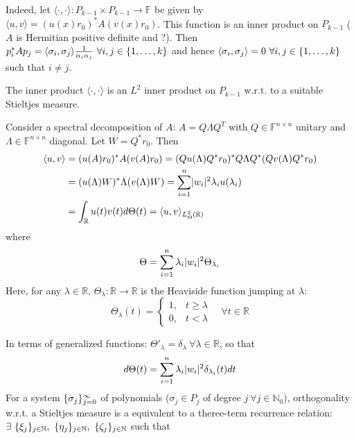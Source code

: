\documentclass[12pt]{article}
\theoremstyle{definition}
\theoremstyle{remark}
\numberwithin{equation}{section}
\newcommand{\F}{\mathbb{F}}
\newcommand{\R}{\mathbb{R}}
\newcommand{\N}{\mathbb{N}}
\DeclarePairedDelimiter{\set}{\{}{\}}
\DeclarePairedDelimiter{\abs}{\lvert}{\rvert}
\DeclarePairedDelimiter{\iprod}{\langle}{\rangle}
\begin{document}
Indeed, let $\langle\cdot,\cdot\rangle: P_{k-1} \times P_{k-1} \rightarrow \F$ be given by $\langle u,v\rangle = (u(x)r_0)^* A (v(x)r_0)$.  This function is an inner product on $P_{k-1}$ ($A$ is Hermitian positive definite and ?). Then $p_i^* A p_j = \langle \sigma_i, \sigma_j \rangle \frac{1}{\alpha_i \alpha_j}\ \forall i,j \in \set{1,\ldots,k}$ and hence $\langle \sigma_i, \sigma_j \rangle = 0\ \forall i,j \in \set{1,\ldots,k}$ such that $i \neq j$.

The inner product $\langle \cdot, \cdot \rangle$ is an $L^2$ inner product on $P_{k-1}$ w.r.t. to a suitable Stieltjes measure.

Consider a spectral decomposition of $A$: $A = Q \Lambda Q^T$ with $Q \in \F^{n\times n}$ unitary and $\Lambda \in \F^{n\times n}$ diagonal. Let $W = Q^* r_0$. Then
\begin{align*}
  \langle u, v \rangle &= (u(A) r_0)^* A (v(A) r_0) = (Qu(\Lambda)Q^* r_0)^* Q \Lambda Q^* (Qv(\Lambda)Q^*r_0) \\
  &= (u(\Lambda)W)^* \Lambda (v(\Lambda)W) = \sum_{i=1}^n \abs{w_i}^2 \lambda_i u(\lambda_i) \\
  &= \int_\R u(t)v(t) d\Theta(t) = \iprod{u,v}_{L^2_\Theta(\R)}
\end{align*}
where
\begin{equation*}
  \Theta = \sum_{i=1}^n \lambda_i \abs{w_i}^2 \Theta_{\lambda_i}
\end{equation*}
Here, for any $\lambda \in \R$, $\Theta_\lambda: \R \rightarrow \R$ is the Heaviside function jumping at $\lambda$:
\begin{equation*}
  \Theta_\lambda(t) =
  \begin{cases}
    1, & t \geq \lambda \\
    0, & t < \lambda
  \end{cases}
  \quad \forall t \in \R
\end{equation*}

In terms of generalized functions: $\Theta'_\lambda = \delta_\lambda\ \forall \lambda \in \R$, so that
\begin{equation*}
  d\Theta(t) = \sum_{i=1}^n \lambda_i \abs{w_i}^2 \delta_{\lambda_i}(t) dt
\end{equation*}
For a system $\set{\sigma_j}_{j=0}^{\infty}$ of polynomials ($\sigma_j \in P_j$ of degree $j\ \forall j \in \N_0$), orthogonality w.r.t. a Stieltjes measure is a equivalent to a theree-term recurrence relation: $\exists\ \set{\xi_j}_{j\in \N},\ \set{\eta_j}_{j\in \N},\ \set{\zeta_j}_{j\in \N}$ such that
\end{document}
